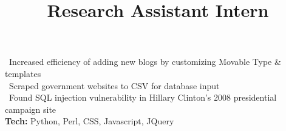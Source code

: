		
        \title{Research Assistant Intern}
        \begin{position}
            \textbullet \ Increased efficiency of adding new blogs by customizing Movable Type \& templates \\
            \textbullet \ Scraped government websites to CSV for database input \\
			\textbullet \ Found SQL injection vulnerability in Hillary Clinton's 2008 presidential campaign site\\
			\textbf{Tech:} Python, Perl, CSS, Javascript, JQuery
        \end{position}
